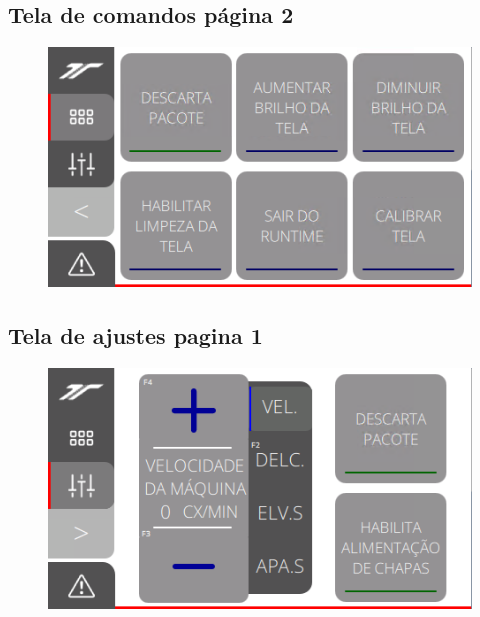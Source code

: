 \newpage
\thispagestyle{fancy}
\vspace*{40 pt}
\subsection{\small{Tela de comandos página 2}}
\vspace*{\fill}
\begin{figure}[h]
  \centering
  \includegraphics{src/imagesFlexo/12-IHMCNT/e-3.png}
\end{figure}
\vspace*{\fill}

\newpage
\thispagestyle{fancy}
\vspace*{40 pt}
\subsection{\small{Tela de ajustes pagina 1}}
\vspace*{\fill}
\begin{figure}[h]
  \centering
  \includegraphics{src/imagesFlexo/12-IHMCNT/e-4.png}
\end{figure}
\vspace*{\fill}

